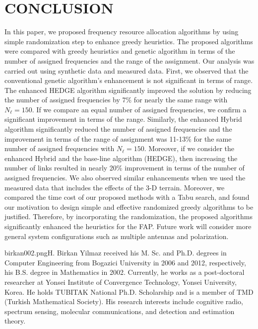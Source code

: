 \documentclass[10pt,twocolumn,twoside]{JCNtran}
\newcommand{\tbirkan}[1]{#1}
\newcommand{\linkl}{\ell}
\newcommand{\numlink}{N_{\linkl}}
\begin{document}
\section{\uppercase{Conclusion}}
\label{sec:concl}
In this paper, we proposed frequency resource allocation algorithms by using \tbirkan{simple} randomization \tbirkan{step} to enhance greedy heuristics. The proposed algorithms were compared with greedy heuristics and genetic algorithm in terms of the number of assigned frequencies and the range of the assignment. Our analysis was carried out using synthetic data and measured data. First, we observed that the conventional genetic algorithm's enhancement is not significant in terms of range. The enhanced HEDGE algorithm significantly improved the solution by reducing the number of assigned frequencies by 7\% for nearly the same range with $\numlink=150$. If we compare an equal number of assigned frequencies, we confirm a significant improvement in terms of the range. Similarly, the enhanced Hybrid algorithm significantly reduced the number of assigned frequencies and the improvement in terms of the range of assignment was 11-13\% for the same number of assigned frequencies with $\numlink=150$. Moreover, if we consider the enhanced Hybrid and the base-line algorithm (HEDGE), then increasing the number of links resulted in nearly 20\% improvement in terms of the number of assigned frequencies. We also observed similar enhancements when we used the measured data that includes the effects of the 3-D terrain. \tbirkan{Moreover, we compared the time cost of our proposed methods with a Tabu search, and found our motivation to design simple and effective randomized greedy algorithms to be justified.} Therefore, by incorporating the randomization, the proposed algorithms significantly enhanced the heuristics for the FAP. Future work will consider more general system configurations such as multiple antennas and polarization. 








\epsfysize=3.2cm
\begin{biography}{birkan002.png}{H. Birkan Yilmaz}
received his M. Sc. and Ph.D. degrees in Computer Engineering from Bogazici University in 2006 and 2012, respectively, his B.S. degree in Mathematics in 2002. Currently, he works as a post-doctoral researcher at Yonsei Institute of Convergence Technology, Yonsei University, Korea. He holds TUBITAK National Ph.D. Scholarship and is a member of TMD (Turkish Mathematical Society). His research interests include cognitive radio, spectrum sensing, molecular communications, and detection and estimation theory.
\end{biography}
\end{document}

